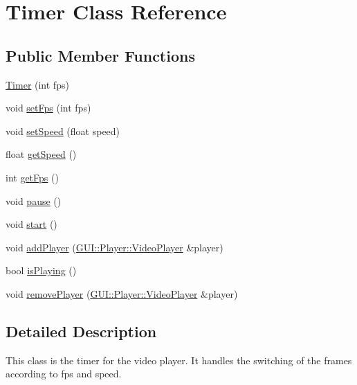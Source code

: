 \hypertarget{classGUI_1_1Player_1_1Timer}{}\section{Timer Class Reference}
\label{classGUI_1_1Player_1_1Timer}
\subsection*{Public Member Functions}
\begin{DoxyCompactItemize}
\item 
\hyperlink{classGUI_1_1Player_1_1Timer_ab333b697b20790f9c540b1c34f1a5eab}{Timer} (int fps)
\item 
void \hyperlink{classGUI_1_1Player_1_1Timer_a9913d8cd6d012c0ecfbc2de831d9d7cd}{set\+Fps} (int fps)
\item 
void \hyperlink{classGUI_1_1Player_1_1Timer_a5466c67c5ec22359c0702dc4ac8ffb19}{set\+Speed} (float speed)
\item 
float \hyperlink{classGUI_1_1Player_1_1Timer_a26ebefde7fe71954e6c1282255951b7d}{get\+Speed} ()
\item 
int \hyperlink{classGUI_1_1Player_1_1Timer_a519ad5c0664b9de28c1a6d9dc77f959d}{get\+Fps} ()
\item 
void \hyperlink{classGUI_1_1Player_1_1Timer_a7167f5c196fc5e167bfabde1a730e81d}{pause} ()
\item 
void \hyperlink{classGUI_1_1Player_1_1Timer_a60de64d75454385b23995437f1d72669}{start} ()
\item 
void \hyperlink{classGUI_1_1Player_1_1Timer_a9aa34416aa131e4a4c4b0a1eafc4b96c}{add\+Player} (\hyperlink{classGUI_1_1Player_1_1VideoPlayer}{G\+U\+I\+::\+Player\+::\+Video\+Player} \&player)
\item 
bool \hyperlink{classGUI_1_1Player_1_1Timer_a8438e3403946accc1986a05b89ee7b03}{is\+Playing} ()
\item 
void \hyperlink{classGUI_1_1Player_1_1Timer_a7a5221da6038d19d8d6b10e36c4befaf}{remove\+Player} (\hyperlink{classGUI_1_1Player_1_1VideoPlayer}{G\+U\+I\+::\+Player\+::\+Video\+Player} \&player)
\end{DoxyCompactItemize}


\subsection{Detailed Description}
This class is the timer for the video player. It handles the switching of the frames according to fps and speed. 

